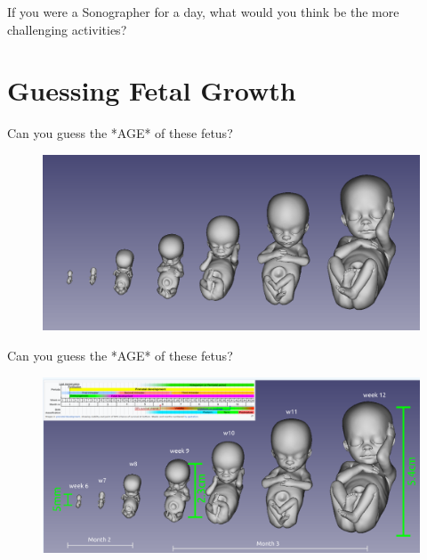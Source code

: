 

{
\begin{frame}{}

\BigSizeFont
If you were a Sonographer for a day, what would you think be the more challenging activities?

\end{frame}
}




\section{Guessing Fetal Growth}


{
\begin{frame}{Can you guess the *AGE* of these fetus?}
      \begin{figure}
        \centering
        \includegraphics[width=1.0\textwidth]{./figures/fetal-ages/versions/drawing-v00.png}
      \end{figure}
\end{frame}
}

{
\begin{frame}{Can you guess the *AGE* of these fetus?}
      \begin{figure}
        \centering
        \includegraphics[width=1.0\textwidth]{./figures/fetal-ages/versions/drawing-v01.png}
      \end{figure}
\end{frame}
}


